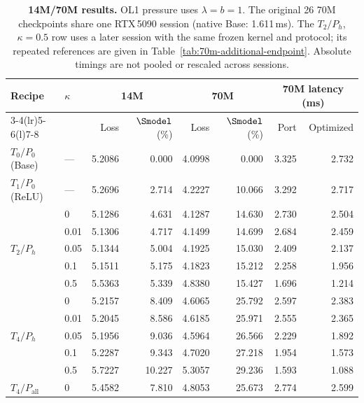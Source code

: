 \begin{table}[H]
\centering\small
\setlength{\tabcolsep}{4pt}
\renewcommand{\arraystretch}{1.02}
\caption{\textbf{14M/70M results.} OL1 pressure uses $\lambda=b=1$. The original 26 70M checkpoints share one RTX\,5090 session (native Base: 1.611\,ms). The $T_2/P_h$, $\kappa=0.5$ row uses a later session with the same frozen kernel and protocol; its repeated references are given in Table~\ref{tab:70m-additional-endpoint}. Absolute timings are not pooled or rescaled across sessions.}
\label{tab:endpoints-14m-70m}
\begin{tabular}{@{}llrrrrrr@{}}
\toprule
\multirow{2}{*}{Recipe} & \multirow{2}{*}{$\kappa$} & \multicolumn{2}{c}{14M} & \multicolumn{2}{c}{70M} & \multicolumn{2}{c}{70M latency (ms)} \\
\cmidrule(lr){3-4}\cmidrule(lr){5-6}\cmidrule(l){7-8}
 & & Loss & $\Smodel$ (\%) & Loss & $\Smodel$ (\%) & Port & Optimized \\
\midrule
$T_{0}/P_{0}$ (Base) & --- & 5.2086 & 0.000 & 4.0998 & 0.000 & 3.325 & 2.732 \\
\midrule
$T_{1}/P_{0}$ (ReLU) & --- & 5.2696 & 2.714 & 4.2227 & 10.066 & 3.292 & 2.717 \\
\midrule
\multirow{5}{*}{$T_{2}/P_{h}$} & 0 & 5.1286 & 4.631 & 4.1287 & 14.630 & 2.730 & 2.504 \\
 & 0.01 & 5.1306 & 4.717 & 4.1499 & 14.699 & 2.684 & 2.459 \\
 & 0.05 & 5.1344 & 5.004 & 4.1925 & 15.030 & 2.409 & 2.137 \\
 & 0.1 & 5.1511 & 5.175 & 4.1823 & 15.212 & 2.258 & 1.956 \\
 & 0.5 & 5.5363 & 5.339 & 4.8380 & 15.427 & 1.696 & 1.214 \\
\midrule
\multirow{5}{*}{$T_{4}/P_{h}$} & 0 & 5.2157 & 8.409 & 4.6065 & 25.792 & 2.597 & 2.383 \\
 & 0.01 & 5.2045 & 8.586 & 4.6185 & 25.971 & 2.555 & 2.365 \\
 & 0.05 & 5.1956 & 9.036 & 4.5964 & 26.566 & 2.229 & 1.892 \\
 & 0.1 & 5.2287 & 9.343 & 4.7020 & 27.218 & 1.954 & 1.573 \\
 & 0.5 & 5.7227 & 10.227 & 5.3057 & 29.236 & 1.593 & 1.088 \\
\midrule
\multirow{5}{*}{$T_{4}/P_{\mathrm{all}}$} & 0 & 5.4582 & 7.810 & 4.8053 & 25.673 & 2.774 & 2.599 \\

\end{tabular}
\end{table}
